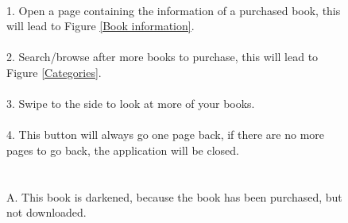 \documentclass[12pt]{article}
\begin{document}
\begin{figure}
\caption{
\\
1. Open a page containing the information of a purchased book, this will lead to Figure \ref{Book information}.\\\\
2. Search/browse after more books to purchase, this will lead to Figure \ref{Categories}.\\\\
3. Swipe to the side to look at more of your books.\\\\
4. This button will always go one page back, if there are no more pages to go back, the application will be closed.\\\\\\
A. This book is darkened, because the book has been purchased, but not downloaded.
}
\label{Front page}
\end{figure}
\end{document}
